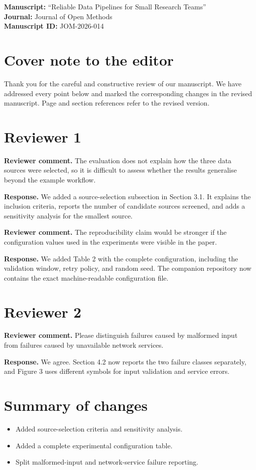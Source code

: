 \documentclass[11pt]{article}
\newcommand{\reviewcomment}[1]{\begin{reviewercomment}\textbf{Reviewer comment. }#1\end{reviewercomment}}
\newcommand{\reviewresponse}[1]{\begin{authorresponse}\textbf{Response. }#1\end{authorresponse}}
\begin{document}
\maketitle
\noindent\textbf{Manuscript:} ``Reliable Data Pipelines for Small Research Teams''\\
\textbf{Journal:} Journal of Open Methods\\\textbf{Manuscript ID:} JOM-2026-014
\section*{Cover note to the editor}
Thank you for the careful and constructive review of our manuscript. We have
addressed every point below and marked the corresponding changes in the
revised manuscript. Page and section references refer to the revised version.
\section*{Reviewer 1}
\reviewcomment{The evaluation does not explain how the three data sources were selected, so it is difficult to assess whether the results generalise beyond the example workflow.}
\reviewresponse{We added a source-selection subsection in Section 3.1. It explains the inclusion criteria, reports the number of candidate sources screened, and adds a sensitivity analysis for the smallest source.}
\reviewcomment{The reproducibility claim would be stronger if the configuration values used in the experiments were visible in the paper.}
\reviewresponse{We added Table 2 with the complete configuration, including the validation window, retry policy, and random seed. The companion repository now contains the exact machine-readable configuration file.}
\section*{Reviewer 2}
\reviewcomment{Please distinguish failures caused by malformed input from failures caused by unavailable network services.}
\reviewresponse{We agree. Section 4.2 now reports the two failure classes separately, and Figure 3 uses different symbols for input validation and service errors.}
\section*{Summary of changes}
\begin{itemize}\item Added source-selection criteria and sensitivity analysis.\item Added a complete experimental configuration table.\item Split malformed-input and network-service failure reporting.\end{itemize}
\end{document}
